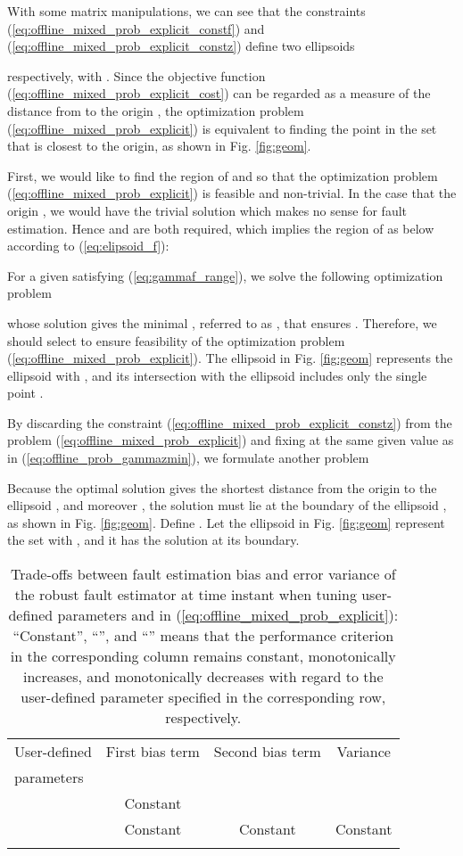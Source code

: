 \documentclass[twocolumn]{autart}
\begin{document}
With some matrix manipulations,
we can see that the constraints (\ref{eq:offline_mixed_prob_explicit_constf}) and (\ref{eq:offline_mixed_prob_explicit_constz}) define two ellipsoids


respectively, with .
Since the objective function (\ref{eq:offline_mixed_prob_explicit_cost})
can be regarded as a measure of the distance from  to
the origin , the optimization problem (\ref{eq:offline_mixed_prob_explicit}) is equivalent to finding the point  in the set
 that is closest to the origin, as shown in Fig. \ref{fig:geom}.


First, we would like to find the region of  and  so that the optimization problem (\ref{eq:offline_mixed_prob_explicit}) is feasible and non-trivial. In the case that the origin , we would have the trivial solution  which makes no sense for fault estimation. Hence
 and  are both required, which implies the region of  as below according to (\ref{eq:elipsoid_f}):


For a given  satisfying (\ref{eq:gammaf_range}), we solve the following optimization problem

whose solution gives the minimal , referred to as , that ensures . Therefore, we should select  to ensure feasibility of the optimization problem (\ref{eq:offline_mixed_prob_explicit}).
The ellipsoid  in Fig. \ref{fig:geom} represents the ellipsoid  with , and its intersection with the ellipsoid  includes only the single point .


By discarding the constraint (\ref{eq:offline_mixed_prob_explicit_constz}) from the problem (\ref{eq:offline_mixed_prob_explicit}) and fixing  at the same given value as in (\ref{eq:offline_prob_gammazmin}), we formulate another problem

Because the optimal solution  gives the shortest distance from the origin to the ellipsoid , and moreover , the solution  must lie at the boundary of the ellipsoid , as shown in Fig. \ref{fig:geom}.
Define . Let the ellipsoid  in Fig. \ref{fig:geom} represent the set  with , and it has the solution   at its boundary.

\begin{table*}[!t]
 \caption{Trade-offs between fault estimation bias and error variance of the robust fault estimator  at time instant  when tuning user-defined parameters  and  in (\ref{eq:offline_mixed_prob_explicit}): ``Constant'', ``'', and ``'' means that the performance criterion in the corresponding column remains constant, monotonically increases, and monotonically decreases with regard to the user-defined parameter specified in the corresponding row, respectively.}
 \label{tab:perf_tradeoff}
 \centering
 \begin{tabular}{lccc}
  \toprule
   User-defined & First bias term & Second bias term & Variance \\
   parameters & 
   & 
   & \\
  \midrule
   & Constant &  &  \\
   & Constant & Constant & Constant \\
   &  &  &  \\
  \bottomrule
 \end{tabular}
\end{table*}
\end{document}
